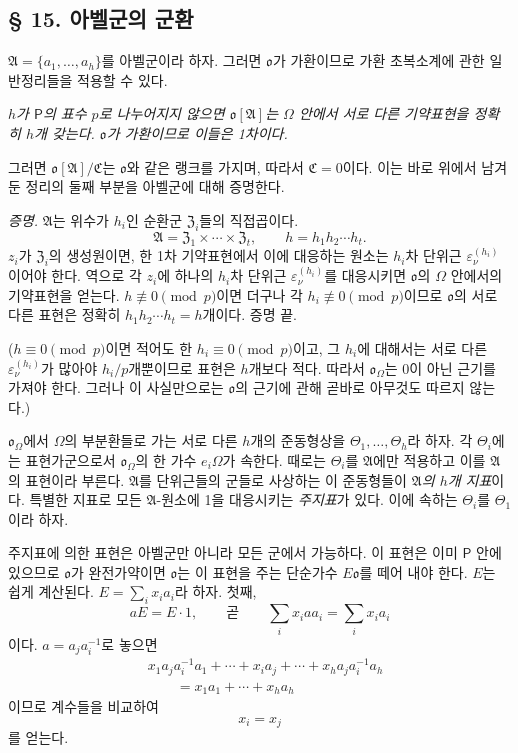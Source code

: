 \subsection*{§ 15. 아벨군의 군환}

\(\mathfrak A=\{a_1,\ldots,a_h\}\)를 아벨군이라 하자. 그러면 \(\mathfrak o\)가 가환이므로 가환 초복소계에 관한 일반정리들을 적용할 수 있다.

\emph{\(h\)가 \(\mathsf P\)의 표수 \(p\)로 나누어지지 않으면 \(\mathfrak o[\mathfrak A]\)는 \(\Omega\) 안에서 서로 다른 기약표현을 정확히 \(h\)개 갖는다. \(\mathfrak o\)가 가환이므로 이들은 1차이다.}

그러면 \(\mathfrak o[\mathfrak A]/\mathfrak C\)는 \(\mathfrak o\)와 같은 랭크를 가지며, 따라서 \(\mathfrak C=0\)이다. 이는 바로 위에서 남겨 둔 정리의 둘째 부분을 아벨군에 대해 증명한다.

\emph{증명.} \(\mathfrak A\)는 위수가 \(h_i\)인 순환군 \(\mathfrak Z_i\)들의 직접곱이다.
\[
        \mathfrak A
        =\mathfrak Z_1\times\cdots\times\mathfrak Z_t,
        \qquad
        h=h_1h_2\cdots h_t.
\]
\(z_i\)가 \(\mathfrak Z_i\)의 생성원이면, 한 1차 기약표현에서 이에 대응하는 원소는 \(h_i\)차 단위근 \(\varepsilon_\nu^{(h_i)}\)이어야 한다. 역으로 각 \(z_i\)에 하나의 \(h_i\)차 단위근 \(\varepsilon_\nu^{(h_i)}\)를 대응시키면 \(\mathfrak o\)의 \(\Omega\) 안에서의 기약표현을 얻는다. \(h\not\equiv0\pmod p\)이면 더구나 각 \(h_i\not\equiv0\pmod p\)이므로 \(\mathfrak o\)의 서로 다른 표현은 정확히 \(h_1h_2\cdots h_t=h\)개이다. 증명 끝.

(\(h\equiv0\pmod p\)이면 적어도 한 \(h_i\equiv0\pmod p\)이고, 그 \(h_i\)에 대해서는 서로 다른 \(\varepsilon_\nu^{(h_i)}\)가 많아야 \(h_i/p\)개뿐이므로 표현은 \(h\)개보다 적다. 따라서 \(\mathfrak o_\Omega\)는 0이 아닌 근기를 가져야 한다. 그러나 이 사실만으로는 \(\mathfrak o\)의 근기에 관해 곧바로 아무것도 따르지 않는다.)

\(\mathfrak o_\Omega\)에서 \(\Omega\)의 부분환들로 가는 서로 다른 \(h\)개의 준동형상을 \(\Theta_1,\ldots,\Theta_h\)라 하자. 각 \(\Theta_i\)에는 표현가군으로서 \(\mathfrak o_\Omega\)의 한 가수 \(e_i\Omega\)가 속한다. 때로는 \(\Theta_i\)를 \(\mathfrak A\)에만 적용하고 이를 \(\mathfrak A\)의 표현이라 부른다. \(\mathfrak A\)를 단위근들의 군들로 사상하는 이 준동형들이 \emph{\(\mathfrak A\)의 \(h\)개 지표}이다. 특별한 지표로 모든 \(\mathfrak A\)-원소에 1을 대응시키는 \emph{주지표}가 있다. 이에 속하는 \(\Theta_i\)를 \(\Theta_1\)이라 하자.

주지표에 의한 표현은 아벨군만 아니라 모든 군에서 가능하다. 이 표현은 이미 \(\mathsf P\) 안에 있으므로 \(\mathfrak o\)가 완전가약이면 \(\mathfrak o\)는 이 표현을 주는 단순가수 \(E\mathfrak o\)를 떼어 내야 한다. \(E\)는 쉽게 계산된다. \(E=\sum_i x_i a_i\)라 하자. 첫째,
\[
        aE=E\cdot1,
        \qquad\text{곧}\qquad
        \sum_i x_i aa_i=\sum_i x_i a_i
\]
이다. \(a=a_j a_i^{-1}\)로 놓으면
\[
\begin{aligned}
&x_1a_ja_i^{-1}a_1+\cdots+x_i a_j+\cdots+x_ha_ja_i^{-1}a_h\\
&\qquad=x_1a_1+\cdots+x_ha_h
\end{aligned}
\]
이므로 계수들을 비교하여
\[
        x_i=x_j
\]
를 얻는다.

